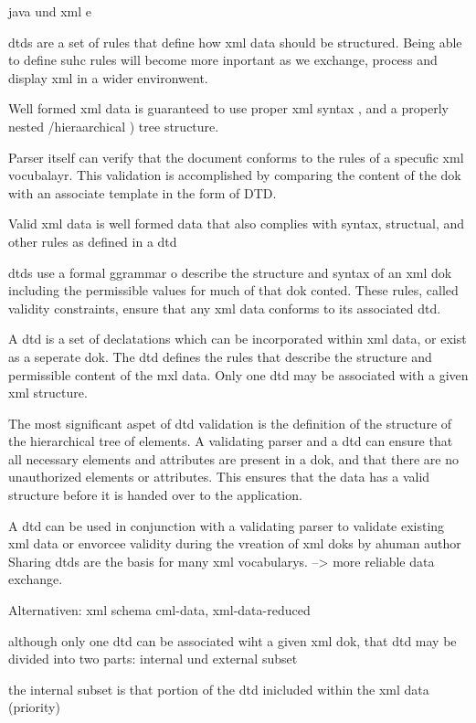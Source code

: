 
java und xml e

dtds are a set of rules that define how xml data should be structured. Being able to define suhc rules will become more inportant as we exchange, process and display xml in a wider environwent.

Well formed xml data is guaranteed to use proper xml syntax , and a properly nested /hieraarchical ) tree structure.

Parser itself can verify that the document conforms to the rules of a specufic xml vocubalayr. This validation is accomplished by comparing the content of the dok with an associate template in the form of DTD.
 
Valid xml data is well formed data that also complies with syntax, structual, and other rules as defined in a dtd

dtds use a formal ggrammar o describe the structure and syntax of an xml dok including the permissible values for much of that dok conted. These rules, called validity constraints, ensure that any xml data conforms to its associated dtd.

A dtd is a set of declatations which can be incorporated within xml data, or exist as a seperate dok. The dtd defines the rules that describe the structure and permissible content of the mxl data. Only one dtd may be associated with a given xml structure.

The most significant aspet of dtd validation is the definition of the structure of the hierarchical tree of elements. A validating parser and a dtd can ensure that all necessary elements and attributes are present in a dok, and that there are no unauthorized elements or attributes. This ensures that the data has a valid structure before it is handed over to the application.

A dtd can be used in conjunction with a validating parser to validate existing xml data or envorcee validity during the vreation of xml doks by ahuman author Sharing dtds are the basis for many xml vocabularys. --> more reliable data exchange.

Alternativen: xml schema cml-data, xml-data-reduced

although only one dtd can be associated wiht a given xml dok, that dtd may be divided into two parts: internal und external subset

the internal subset is that portion of the dtd inicluded within the xml data (priority)

